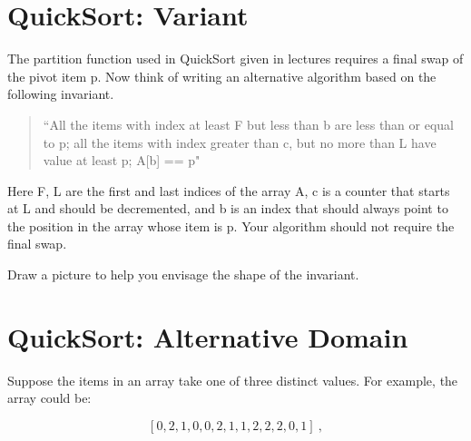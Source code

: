 \documentclass[twoside=false,DIV=14]{scrartcl}
\begin{document}


\section{QuickSort: Variant}
The partition function used in QuickSort given in lectures requires a final swap of the pivot item p.   Now think of writing an alternative algorithm based on the following invariant.

\bigskip

\begin{quotation}
    ``All the items with index at least F but less than b are less than or equal to p;
            all the items with index greater than c, but no more than L have value at least p;
        A[b] == p"
        \end{quotation} 

\bigskip

Here F, L are the first and last indices of the array A, c is a counter that starts at L and should
be decremented, and b is an index that should always point to the position in the array whose item is p. Your algorithm should not require the final swap.
    
\begin{hint}
Draw a picture to help you envisage the shape of the invariant.
\end{hint}

\section{QuickSort: Alternative Domain}
Suppose the items in an array take one of three distinct values.  For example, the array could be:
    
\[
[0, 2, 1, 0, 0, 2, 1, 1, 2, 2, 2, 0, 1]~,
\]
    
\end{document}
